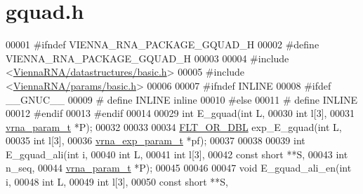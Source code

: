 \hypertarget{gquad_8h_source}{}\section{gquad.\+h}
\label{gquad_8h_source}

\begin{DoxyCode}
00001 \textcolor{preprocessor}{#ifndef VIENNA\_RNA\_PACKAGE\_GQUAD\_H}
00002 \textcolor{preprocessor}{#define VIENNA\_RNA\_PACKAGE\_GQUAD\_H}
00003 
00004 \textcolor{preprocessor}{#include <\hyperlink{datastructures_2basic_8h}{ViennaRNA/datastructures/basic.h}>}
00005 \textcolor{preprocessor}{#include <\hyperlink{params_2basic_8h}{ViennaRNA/params/basic.h}>}
00006 
00007 \textcolor{preprocessor}{#ifndef INLINE}
00008 \textcolor{preprocessor}{#ifdef \_\_GNUC\_\_}
00009 \textcolor{preprocessor}{# define INLINE inline}
00010 \textcolor{preprocessor}{#else}
00011 \textcolor{preprocessor}{# define INLINE}
00012 \textcolor{preprocessor}{#endif}
00013 \textcolor{preprocessor}{#endif}
00014 
00029 \textcolor{keywordtype}{int}         E\_gquad(\textcolor{keywordtype}{int}           L,
00030                     \textcolor{keywordtype}{int}           l[3],
00031                     \hyperlink{group__energy__parameters_structvrna__param__s}{vrna\_param\_t}  *P);
00032 
00033 
00034 \hyperlink{group__data__structures_ga31125aeace516926bf7f251f759b6126}{FLT\_OR\_DBL}  exp\_E\_gquad(\textcolor{keywordtype}{int}               L,
00035                         \textcolor{keywordtype}{int}               l[3],
00036                         \hyperlink{group__energy__parameters_structvrna__exp__param__s}{vrna\_exp\_param\_t}  *pf);
00037 
00038 
00039 \textcolor{keywordtype}{int}         E\_gquad\_ali(\textcolor{keywordtype}{int}           i,
00040                         \textcolor{keywordtype}{int}           L,
00041                         \textcolor{keywordtype}{int}           l[3],
00042                         \textcolor{keyword}{const} \textcolor{keywordtype}{short}   **S,
00043                         \textcolor{keywordtype}{int}           n\_seq,
00044                         \hyperlink{group__energy__parameters_structvrna__param__s}{vrna\_param\_t}  *P);
00045 
00046 
00047 \textcolor{keywordtype}{void} E\_gquad\_ali\_en(\textcolor{keywordtype}{int}           i,
00048                     \textcolor{keywordtype}{int}           L,
00049                     \textcolor{keywordtype}{int}           l[3],
00050                     \textcolor{keyword}{const} \textcolor{keywordtype}{short}   **S,

\end{DoxyCode}
